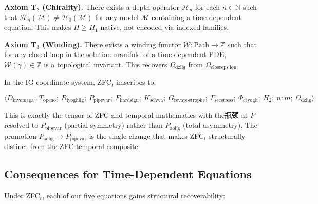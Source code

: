 \documentclass[12pt,a4paper]{article}
\begin{document}
\textbf{Axiom T$_2$ (Chirality).} There exists a depth operator $\mathcal{H}_n$ for each $n \in \mathbb{N}$ such that $\mathcal{H}_n(\mathcal{M}) \neq \mathcal{H}_0(\mathcal{M})$ for any model $\mathcal{M}$ containing a time-dependent equation. This makes $H \geq H_1$ native, not encoded via indexed families.

\textbf{Axiom T$_3$ (Winding).} There exists a winding functor $\mathcal{W}: \text{Path} \to \mathbb{Z}$ such that for any closed loop in the solution manifold of a time-dependent PDE, $\mathcal{W}(\gamma) \in \mathbb{Z}$ is a topological invariant. This recovers $\Omega_{\text{dzlig}}$ from $\Omega_{\text{closeepsilon}}$.

In the IG coordinate system, ZFC$_t$ imscribes to:

\[\langle D_{\text{invomega}};\ T_{\text{openo}};\ R_{\text{lyoghlig}};\ P_{\text{pipevar}};\ F_{\text{hardsign}};\ K_{\text{schwa}};\ G_{\text{revapostrophe}};\ \Gamma_{\text{secstress}};\ \Phi_{\text{ctyogh}};\ H_2;\ n{:}m;\ \Omega_{\text{dzlig}} \rangle\]

This is exactly the tensor of ZFC and temporal mathematics with the瓶颈 at $P$ resolved to $P_{\text{pipevar}}$ (partial symmetry) rather than $P_{\text{aolig}}$ (total asymmetry). The promotion $P_{\text{aolig}} \to P_{\text{pipevar}}$ is the single change that makes ZFC$_t$ structurally distinct from the ZFC-temporal composite.

\subsection{Consequences for Time-Dependent Equations}

Under ZFC$_t$, each of our five equations gains structural recoverability:
\end{document}
